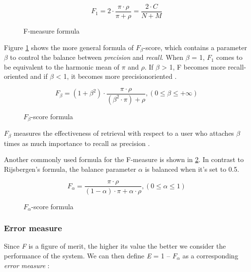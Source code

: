\begin{figure}[H]
\begin{displaymath}
	F_1 = 2 \cdot \frac{\pi \cdot \rho}{\pi + \rho} = \frac{2 \cdot C}{N + M}
\end{displaymath}
\caption{F-measure formula}
\end{figure}

Figure \ref{fig:fbeta-score} shows the more general formula of $\textit{F}_\beta$-score, which contains a parameter $\beta$ to control the balance between \textit{precision} and \textit{recall}. When $\beta$ = 1, $\textit{F}_\textit{1}$ comes to be equivalent to the harmonic mean of $\pi$ and $\rho$. If $\beta$ > 1, F becomes more recall-oriented and if $\beta$ < 1, it becomes more precisionoriented \cite{Sasaki:2007}.

\begin{figure}[H]
\begin{displaymath}
	F_\beta = (1+\beta^2) \cdot \frac{\pi \cdot \rho}{(\beta^2 \cdot \pi) + \rho}, (0 \le \beta \le +\infty)
\end{displaymath}
\caption{$\textit{F}_\beta$-score formula \cite{Chinchor:1992}}
\label{fig:fbeta-score}
\end{figure}

$\textit{F}_\beta$ measures the effectiveness of retrieval with respect to a user who attaches $\beta$ times as much importance to recall as precision \cite{Rijsbergen:1979}.

Another commonly used formula for the F-measure is shown in \ref{fig:falpha-score}. In contrast to Rijsbergen's formula, the balance parameter $\alpha$ is balanced when it's set to 0.5.

\begin{figure}[H]
\begin{displaymath}
	F_\alpha = \frac{\pi \cdot \rho}{(1-\alpha) \cdot \pi + \alpha \cdot \rho}, (0 \le \alpha \le 1)
\end{displaymath}
\caption{$\textit{F}_\alpha$-score formula \cite{Makhoul:1999}}
\label{fig:falpha-score}
\end{figure}

\subsubsection{Error measure}
Since \textit{F} is a figure of merit, the higher its value the better we consider the performance of the system. We can then define \textit{E} = 1 – $F_\alpha$ as a corresponding \textit{error measure} \cite{Makhoul:1999}:

